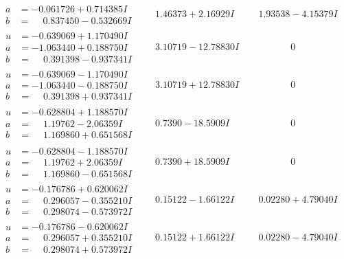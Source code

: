 \documentclass[1p]{elsarticle_modified}
\theoremstyle{definition}
\begin{document}
$$\begin{array}{c|c|c}
\begin{aligned}
a &= -0.061726 + 0.714385 I \\
b &= \phantom{-}0.837450 - 0.532669 I\end{aligned}
 & \phantom{-}1.46373 + 2.16929 I & \phantom{-}1.93538 - 4.15379 I \\ \hline\begin{aligned}
u &= -0.639069 + 1.170490 I \\
a &= -1.063440 + 0.188750 I \\
b &= \phantom{-}0.391398 - 0.937341 I\end{aligned}
 & \phantom{-}3.10719 - 12.78830 I & \phantom{-0.000000 } 0 \\ \hline\begin{aligned}
u &= -0.639069 - 1.170490 I \\
a &= -1.063440 - 0.188750 I \\
b &= \phantom{-}0.391398 + 0.937341 I\end{aligned}
 & \phantom{-}3.10719 + 12.78830 I & \phantom{-0.000000 } 0 \\ \hline\begin{aligned}
u &= -0.628804 + 1.188570 I \\
a &= \phantom{-}1.19762 - 2.06359 I \\
b &= \phantom{-}1.169860 + 0.651568 I\end{aligned}
 & \phantom{-}0.7390 - 18.5909 I & \phantom{-0.000000 } 0 \\ \hline\begin{aligned}
u &= -0.628804 - 1.188570 I \\
a &= \phantom{-}1.19762 + 2.06359 I \\
b &= \phantom{-}1.169860 - 0.651568 I\end{aligned}
 & \phantom{-}0.7390 + 18.5909 I & \phantom{-0.000000 } 0 \\ \hline\begin{aligned}
u &= -0.176786 + 0.620062 I \\
a &= \phantom{-}0.296057 - 0.355210 I \\
b &= \phantom{-}0.298074 - 0.573972 I\end{aligned}
 & \phantom{-}0.15122 - 1.66122 I & \phantom{-}0.02280 + 4.79040 I \\ \hline\begin{aligned}
u &= -0.176786 - 0.620062 I \\
a &= \phantom{-}0.296057 + 0.355210 I \\
b &= \phantom{-}0.298074 + 0.573972 I\end{aligned}
 & \phantom{-}0.15122 + 1.66122 I & \phantom{-}0.02280 - 4.79040 I\\

\end{array}$$
\end{document}
